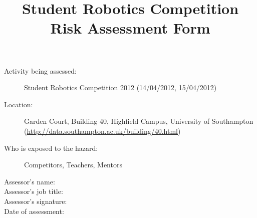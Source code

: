 \documentclass[12pt,a4paper]{scrartcl}
\title{Student Robotics Competition Risk Assessment Form}
\begin{document}
\maketitle

\begin{description}
\item[Activity being assessed:] Student Robotics Competition 2012 (14/04/2012, 15/04/2012)
\item[Location:] Garden Court, Building 40, Highfield Campus, University of Southampton (\url{http://data.southampton.ac.uk/building/40.html})
\item[Who is exposed to the hazard:] Competitors, Teachers, Mentors
\end{description}

\begin{description}
\item[Assessor's name:]
\item[Assessor's job title:]
\item[Assessor's signature:]
\item[Date of assessment:]
\end{description}
\clearpage

\newcommand{\risk}[3]{
 #1 & #2 & #3 \\
}
\end{document}
